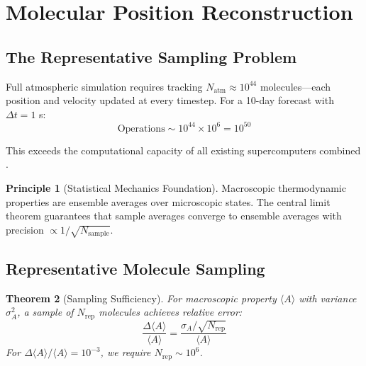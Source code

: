 \documentclass[twocolumn,10pt,a4paper]{article}
\newtheorem{theorem}{Theorem}[section]
\theoremstyle{definition}
\newtheorem{principle}[theorem]{Principle}
\theoremstyle{remark}
\begin{document}
\section{Molecular Position Reconstruction}
\label{sec:reconstruction}

\subsection{The Representative Sampling Problem}

Full atmospheric simulation requires tracking $N_{\text{atm}} \approx 10^{44}$ molecules—each position and velocity updated at every timestep. For a 10-day forecast with $\Delta t = 1$ s:
\begin{equation}
    \text{Operations} \sim 10^{44} \times 10^6 = 10^{50}
\end{equation}

This exceeds the computational capacity of all existing supercomputers combined \cite{dongarra2019exascale}.

\begin{principle}[Statistical Mechanics Foundation]
\label{prin:statistical}
Macroscopic thermodynamic properties are ensemble averages over microscopic states. The central limit theorem guarantees that sample averages converge to ensemble averages with precision $\propto 1/\sqrt{N_{\text{sample}}}$.
\end{principle}

\subsection{Representative Molecule Sampling}

\begin{theorem}[Sampling Sufficiency]
\label{thm:sufficient_sampling}
For macroscopic property $\langle A \rangle$ with variance $\sigma^2_A$, a sample of $N_{\text{rep}}$ molecules achieves relative error:
\begin{equation}
    \frac{\Delta\langle A \rangle}{\langle A \rangle} = \frac{\sigma_A/\sqrt{N_{\text{rep}}}}{\langle A \rangle}
\end{equation}
For $\Delta\langle A \rangle / \langle A \rangle = 10^{-3}$, we require $N_{\text{rep}} \sim 10^6$.
\end{theorem}
\end{document}
